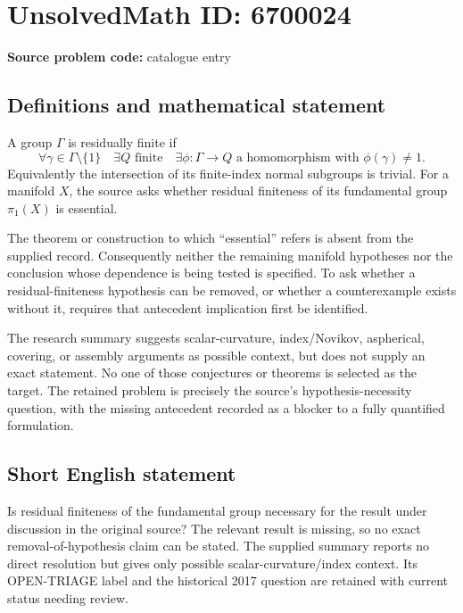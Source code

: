 \documentclass[11pt]{article}
\begin{document}
\section*{UnsolvedMath ID: 6700024}
\textbf{Source problem code:} catalogue entry
\subsection{Definitions and mathematical statement}
A group $\Gamma$ is residually finite if
\[
 \forall\gamma\in\Gamma\setminus\{1\}\quad
 \exists Q\text{ finite}\quad\exists\phi:\Gamma\to Q
 \text{ a homomorphism with }\phi(\gamma)\ne1.
\]
Equivalently the intersection of its finite-index normal subgroups is trivial. For a manifold $X$, the source asks whether residual finiteness of its fundamental group $\pi_1(X)$ is essential.

The theorem or construction to which ``essential'' refers is absent from the supplied record. Consequently neither the remaining manifold hypotheses nor the conclusion whose dependence is being tested is specified. To ask whether a residual-finiteness hypothesis can be removed, or whether a counterexample exists without it, requires that antecedent implication first be identified.

The research summary suggests scalar-curvature, index/Novikov, aspherical, covering, or assembly arguments as possible context, but does not supply an exact statement. No one of those conjectures or theorems is selected as the target. The retained problem is precisely the source's hypothesis-necessity question, with the missing antecedent recorded as a blocker to a fully quantified formulation.
\subsection{Short English statement}
Is residual finiteness of the fundamental group necessary for the result under discussion in the original source? The relevant result is missing, so no exact removal-of-hypothesis claim can be stated. The supplied summary reports no direct resolution but gives only possible scalar-curvature/index context. Its OPEN-TRIAGE label and the historical 2017 question are retained with current status needing review.
\end{document}
